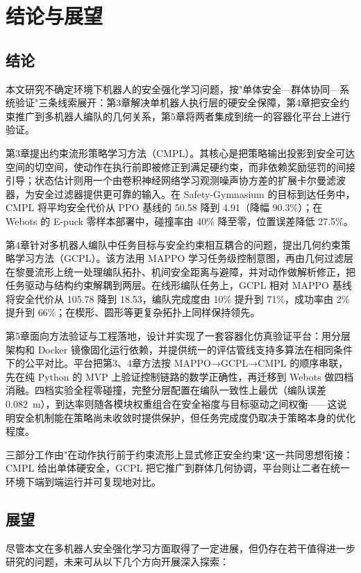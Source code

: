 \chapter{结论与展望}

\section{结论}
本文研究不确定环境下机器人的安全强化学习问题，按"单体安全—群体协同—系统验证"三条线索展开：第3章解决单机器人执行层的硬安全保障，第4章把安全约束推广到多机器人编队的几何关系，第5章将两者集成到统一的容器化平台上进行验证。

第3章提出约束流形策略学习方法（CMPL）。其核心是把策略输出投影到安全可达空间的切空间，使动作在执行前即被修正到满足硬约束，而非依赖奖励惩罚的间接引导；状态估计则用一个由卷积神经网络学习观测噪声协方差的扩展卡尔曼滤波器，为安全过滤器提供更可靠的输入。在 Safety-Gymnasium 的目标到达任务中，CMPL 将平均安全代价从 PPO 基线的 50.58 降到 4.91（降幅 90.3\%）；在 Webots 的 E-puck 零样本部署中，碰撞率由 40\% 降至零，位置误差降低 27.5\%。

第4章针对多机器人编队中任务目标与安全约束相互耦合的问题，提出几何约束策略学习方法（GCPL）。该方法用 MAPPO 学习任务级控制意图，再由几何过滤层在黎曼流形上统一处理编队拓扑、机间安全距离与避障，并对动作做解析修正，把任务驱动与结构约束解耦到两层。在线形编队任务上，GCPL 相对 MAPPO 基线将安全代价从 105.78 降到 18.53，编队完成度由 10\% 提升到 71\%，成功率由 2\% 提升到 66\%；在楔形、圆形等更复杂拓扑上同样保持领先。

第5章面向方法验证与工程落地，设计并实现了一套容器化仿真验证平台：用分层架构和 Docker 镜像固化运行依赖，并提供统一的评估管线支持多算法在相同条件下的公平对比。平台把第3、4章方法按 MAPPO→GCPL→CMPL 的顺序串联，先在纯 Python 的 MVP 上验证控制链路的数学正确性，再迁移到 Webots 做四档消融。四档实验全程零碰撞，完整分层配置在编队一致性上最优（编队误差 0.082~m），到达率则随各模块权重组合在安全裕度与目标驱动之间权衡——这说明安全机制能在策略尚未收敛时提供保护，但任务完成度仍取决于策略本身的优化程度。

三部分工作由"在动作执行前于约束流形上显式修正安全约束"这一共同思想衔接：CMPL 给出单体硬安全，GCPL 把它推广到群体几何协调，平台则让二者在统一环境下端到端运行并可复现地对比。

\section{展望}

尽管本文在多机器人安全强化学习方面取得了一定进展，但仍存在若干值得进一步研究的问题，未来可从以下几个方向开展深入探索：


